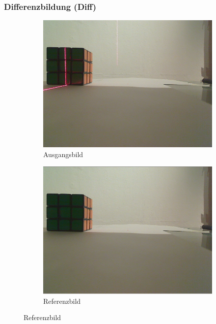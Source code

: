 \documentclass[ngerman,a4paper,parskip=half]{scrartcl}
\begin{document}
\subsubsection{Differenzbildung (Diff)}

\begin{figure}[H]
	\centering

	\begin{subfigure}{0.23\textwidth}
		\includegraphics[width=\textwidth]{includes/line_line.png}
		\caption{Ausgangsbild}
	\end{subfigure}
	\hfill
	\begin{subfigure}{0.23\textwidth}
		\includegraphics[width=\textwidth]{includes/line_ref.png}
		\caption{Referenzbild}

\end{subfigure}
\end{figure}
\end{document}
